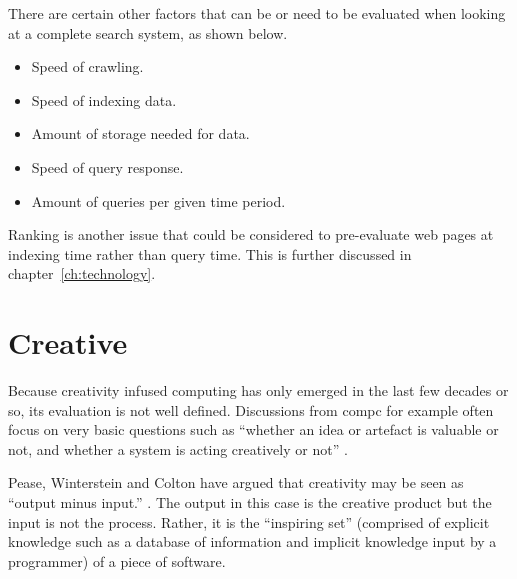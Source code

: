 There are certain other factors that can be or need to be evaluated when looking at a complete search system, as shown below.

\begin{itemize}
  \item Speed of crawling.
  \item Speed of indexing data.
  \item Amount of storage needed for data.
  \item Speed of query response.
  \item Amount of queries per given time period.
\end{itemize}

Ranking is another issue that could be considered to pre-evaluate web pages at indexing time rather than query time. This is further discussed in chapter~\ref{ch:technology}.





\section{Creative}
\label{s:creattributes}


Because creativity infused computing has only emerged in the last few decades or so, its evaluation is not well defined. Discussions from \gls{compc} for example often focus on very basic questions such as ``whether an idea or artefact is valuable or not, and whether a system is acting creatively or not'' \autocite{Pease2011}.

Pease, Winterstein and Colton have argued that creativity may be seen as ``output minus input.'' \autocite[p.2]{Pease2001}. The output in this case is the creative product but the input is not the process. Rather, it is the ``inspiring set'' (comprised of explicit knowledge such as a database of information and implicit knowledge input by a programmer) of a piece of software.

